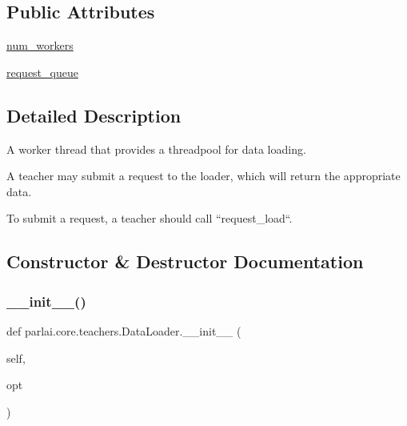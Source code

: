 \subsection*{Public Attributes}
\begin{DoxyCompactItemize}
\item 
\hyperlink{classparlai_1_1core_1_1teachers_1_1DataLoader_a223a0d846ce98840f8f3338611f94d34}{num\+\_\+workers}
\item 
\hyperlink{classparlai_1_1core_1_1teachers_1_1DataLoader_a960bf1159e437cfb304352213df50a8f}{request\+\_\+queue}
\end{DoxyCompactItemize}


\subsection{Detailed Description}
\begin{DoxyVerb}A worker thread that provides a threadpool for data loading.

A teacher may submit a request to the loader, which will return the
appropriate data.

To submit a request, a teacher should call ``request_load``.
\end{DoxyVerb}
 

\subsection{Constructor \& Destructor Documentation}
\mbox{\label{classparlai_1_1core_1_1teachers_1_1DataLoader_af06f90bbe1a2d310ac43e963c2eb8f88}} 
\subsubsection{\texorpdfstring{\+\_\+\+\_\+init\+\_\+\+\_\+()}{\_\_init\_\_()}}
{\footnotesize\ttfamily def parlai.\+core.\+teachers.\+Data\+Loader.\+\_\+\+\_\+init\+\_\+\+\_\+ (\begin{DoxyParamCaption}\item[{}]{self,  }\item[{}]{opt }\end{DoxyParamCaption})}



